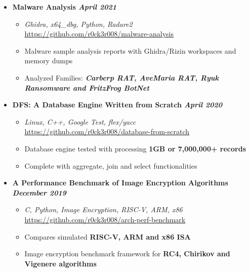 \documentclass[9]{Resume}
\begin{document}
\begin{itemize}[noitemsep,nolistsep]
    \item[]\textbf{Malware Analysis \hfill \textit{April 2021}}
        \begin{itemize}[leftmargin=*]
            \setlength\itemsep{-0.25em}
            \item[\textbullet]\textit{Ghidra, x64\_dbg, Python, Radare2} \hfill \href{https://github.com/r0ck3r008/malware-analysis}{{\scriptsize https://github.com/r0ck3r008/malware-analysis}}
            \item[\textbullet]Malware sample analysis reports with Ghidra/Rizin workspaces and memory dumps
			\item[\textbullet]Analyzed Families: \textbf{\textit{Carberp RAT, AveMaria RAT, Ryuk Ransomware and FritzFrog BotNet}}
        \end{itemize}

    \item[]\textbf{DFS: A Database Engine Written from Scratch \hfill \textit{April 2020}}
        \begin{itemize}[leftmargin=*]
            \setlength\itemsep{-0.25em}
            \item[\textbullet]\textit{Linux, C++, Google Test, flex/yacc} \hfill \href{https://github.com/r0ck3r008/database-from-scratch}{{\scriptsize https://github.com/r0ck3r008/database-from-scratch}}
            \item[\textbullet]Database engine tested with processing \textbf{1GB or 7,000,000+ records}
            \item[\textbullet]Complete with aggregate, join and select functionalities
        \end{itemize}

    \item[]\textbf{A Performance Benchmark of Image Encryption Algorithms \hfill \textit{December 2019}}
        \begin{itemize}[leftmargin=*]
            \setlength\itemsep{-0.25em}
            \item[\textbullet]\textit{C, Python, Image Encryption, RISC-V, ARM, x86} \hfill \href{https://github.com/r0ck3r008/arch-perf-benchmark}{{\scriptsize https://github.com/r0ck3r008/arch-perf-benchmark}}
            \item[\textbullet]Compares simulated \textbf{RISC-V, ARM and x86 ISA}
            \item[\textbullet]Image encryption benchmark framework for \textbf{RC4, Chirikov and Vigenere algorithms}
        \end{itemize}


\end{itemize}
\end{document}
